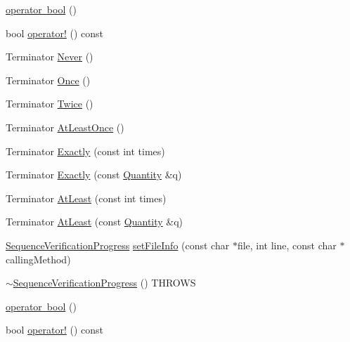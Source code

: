 \begin{DoxyCompactItemize}
\mbox{\hyperlink{classfakeit_1_1SequenceVerificationProgress_a462f6bec1f00814e918f9be6bd5f84e6}{operator bool}} ()
\item 
bool \mbox{\hyperlink{classfakeit_1_1SequenceVerificationProgress_a43f9268650854f97cbae3b28487c2be0}{operator!}} () const
\item 
Terminator \mbox{\hyperlink{classfakeit_1_1SequenceVerificationProgress_ad71678d34cb297945ecad2e1fe825f31}{Never}} ()
\item 
Terminator \mbox{\hyperlink{classfakeit_1_1SequenceVerificationProgress_a4a3260eb1380fcee1c0d8ae162ea57f4}{Once}} ()
\item 
Terminator \mbox{\hyperlink{classfakeit_1_1SequenceVerificationProgress_ac453e14db60c17c23748cc5f4f2325ca}{Twice}} ()
\item 
Terminator \mbox{\hyperlink{classfakeit_1_1SequenceVerificationProgress_a682eed8897bda26aa2927f0a0b03f0b1}{At\+Least\+Once}} ()
\item 
Terminator \mbox{\hyperlink{classfakeit_1_1SequenceVerificationProgress_a74c04958c69e3c977ce873de3787305d}{Exactly}} (const int times)
\item 
Terminator \mbox{\hyperlink{classfakeit_1_1SequenceVerificationProgress_abb39ac5b5e16e07b1caaf01325228c47}{Exactly}} (const \mbox{\hyperlink{structfakeit_1_1Quantity}{Quantity}} \&q)
\item 
Terminator \mbox{\hyperlink{classfakeit_1_1SequenceVerificationProgress_a83ba8d481bb79dad783f9bc821dd650e}{At\+Least}} (const int times)
\item 
Terminator \mbox{\hyperlink{classfakeit_1_1SequenceVerificationProgress_a1f6e949249d3f8119e920f6df6f7ade2}{At\+Least}} (const \mbox{\hyperlink{structfakeit_1_1Quantity}{Quantity}} \&q)
\item 
\mbox{\hyperlink{classfakeit_1_1SequenceVerificationProgress}{Sequence\+Verification\+Progress}} \mbox{\hyperlink{classfakeit_1_1SequenceVerificationProgress_aeeadb72fd4e0f52c06fa28c6b54d8188}{set\+File\+Info}} (const char $\ast$file, int line, const char $\ast$calling\+Method)
\item 
\mbox{\hyperlink{classfakeit_1_1SequenceVerificationProgress_a2c3325aa3d50002ef448d31e21494f76}{$\sim$\+Sequence\+Verification\+Progress}} () T\+H\+R\+O\+WS
\item 
\mbox{\hyperlink{classfakeit_1_1SequenceVerificationProgress_a462f6bec1f00814e918f9be6bd5f84e6}{operator bool}} ()
\item 
bool \mbox{\hyperlink{classfakeit_1_1SequenceVerificationProgress_a43f9268650854f97cbae3b28487c2be0}{operator!}} () const

\end{DoxyCompactItemize}
